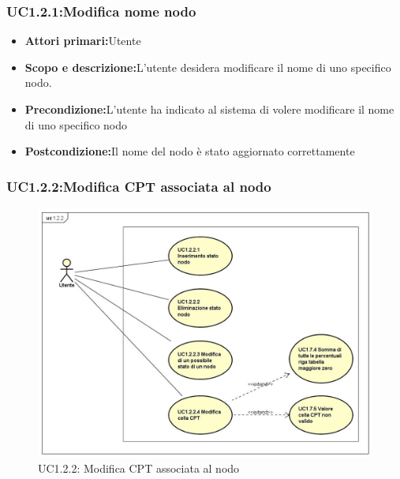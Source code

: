 \subsubsection{UC1.2.1:Modifica nome nodo}
\begin{itemize}
	\item{\textbf{Attori primari:}Utente}
	\item{\textbf{Scopo e descrizione:}L'utente desidera modificare il nome di uno specifico nodo.}
	\item{\textbf{Precondizione:}L'utente ha indicato al sistema di volere modificare il nome di uno specifico nodo}
	\item{\textbf{Postcondizione:}Il nome del nodo è stato aggiornato correttamente}
\end{itemize}
\subsubsection{UC1.2.2:Modifica CPT associata al nodo}
\begin{figure} [H]
	\centering
	\includegraphics[scale=0.45]{Img/UC1-2-2}
	\caption{UC1.2.2: Modifica CPT associata al nodo}\label{}
\end{figure}
